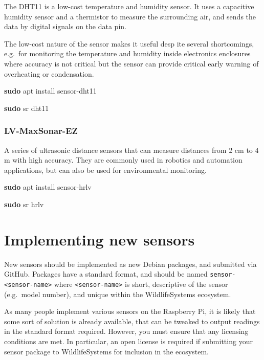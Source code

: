 \documentclass[
]{book}
\newenvironment{Shaded}{\begin{snugshade}}{\end{snugshade}}
\newcommand{\FunctionTok}[1]{\textcolor[rgb]{0.13,0.29,0.53}{\textbf{#1}}}
\newcommand{\NormalTok}[1]{#1}
\begin{document}
The DHT11 is a low-cost temperature and humidity sensor. It uses a capacitive humidity sensor and a thermistor to measure the surrounding air, and sends the data by digital signals on the data pin.

The low-cost nature of the sensor makes it useful desp ite several shortcomings, e.g.~for monitoring the temperature and humidity inside electronics enclosures where accuracy is not critical but the sensor can provide critical early warning of overheating or condensation.

\begin{Shaded}
\begin{Highlighting}[]
\FunctionTok{sudo}\NormalTok{ apt install sensor{-}dht11}

\FunctionTok{sudo}\NormalTok{ sr dht11}
\end{Highlighting}
\end{Shaded}

\subsection{LV-MaxSonar-EZ}\label{lv-maxsonar-ez}

A series of ultrasonic distance sensors that can measure distances from 2 cm to 4 m with high accuracy. They are commonly used in robotics and automation applications, but can also be used for environmental monitoring.

\begin{Shaded}
\begin{Highlighting}[]
\FunctionTok{sudo}\NormalTok{ apt install sensor{-}hrlv}

\FunctionTok{sudo}\NormalTok{ sr hrlv}
\end{Highlighting}
\end{Shaded}

\chapter{Implementing new sensors}\label{implementing-new-sensors}

New sensors should be implemented as new Debian packages, and submitted via GitHub. Packages have a standard format, and should be named \texttt{sensor-\textless{}sensor-name\textgreater{}} where \texttt{\textless{}sensor-name\textgreater{}} is short, descriptive of the sensor (e.g.~model number), and unique within the WildlifeSystems ecosystem.

As many people implement various sensors on the Raspberry Pi, it is likely that some sort of solution is already available, that can be tweaked to output readings in the standard format required. However, you must ensure that any licensing conditions are met. In particular, an open license is required if submitting your sensor package to WildlifeSystems for inclusion in the ecosystem.
\end{document}
